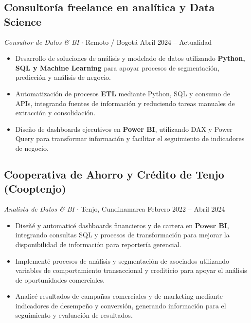 \documentclass[letterpaper,10pt]{article}
\begin{document}
\subsection*{Consultoría freelance en analítica y Data Science}
\textit{Consultor de Datos \& BI} \hspace{4pt}$\cdot$\hspace{4pt} Remoto / Bogotá \hfill \small{Abril 2024 -- Actualidad}
\begin{itemize}
    \item Desarrollo de soluciones de análisis y modelado de datos utilizando \textbf{Python, SQL y Machine Learning} para apoyar procesos de segmentación, predicción y análisis de negocio.
    \item Automatización de procesos \textbf{ETL} mediante Python, SQL y consumo de APIs, integrando fuentes de información y reduciendo tareas manuales de extracción y consolidación.
    \item Diseño de dashboards ejecutivos en \textbf{Power BI}, utilizando DAX y Power Query para transformar información y facilitar el seguimiento de indicadores de negocio.
\end{itemize}

\vspace{0.08cm}
\subsection*{Cooperativa de Ahorro y Crédito de Tenjo (Cooptenjo)}
\textit{Analista de Datos \& BI} \hspace{4pt}$\cdot$\hspace{4pt} Tenjo, Cundinamarca \hfill \small{Febrero 2022 -- Abril 2024}
\begin{itemize}
    \item Diseñé y automaticé dashboards financieros y de cartera en \textbf{Power BI}, integrando consultas SQL y procesos de transformación para mejorar la disponibilidad de información para reportería gerencial.
    \item Implementé procesos de análisis y segmentación de asociados utilizando variables de comportamiento transaccional y crediticio para apoyar el análisis de oportunidades comerciales.
    \item Analicé resultados de campañas comerciales y de marketing mediante indicadores de desempeño y conversión, generando información para el seguimiento y evaluación de resultados.
\end{itemize}

\end{document}
